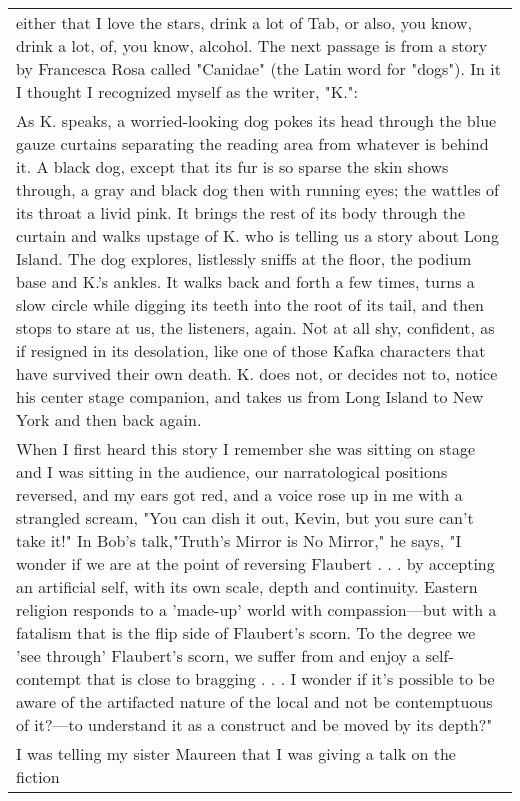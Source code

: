 \begin{longtable}[]{@{}l@{}}
\begin{minipage}[t]{0.97\columnwidth}
either that I love the stars, drink a lot of Tab, or also, you know,
drink a lot, of, you know, alcohol. The next passage is from a story by
Francesca Rosa called "Canidae" (the Latin word for "dogs"). In it I
thought I recognized myself as the writer, "K.":\strut
\end{minipage}\tabularnewline
\begin{minipage}[t]{0.97\columnwidth}\raggedright
As K. speaks, a worried-looking dog pokes its head through the blue
gauze curtains separating the reading area from whatever is behind it. A
black dog, except that its fur is so sparse the skin shows through, a
gray and black dog then with running eyes; the wattles of its throat a
livid pink. It brings the rest of its body through the curtain and walks
upstage of K. who is telling us a story about Long Island. The dog
explores, listlessly sniffs at the floor, the podium base and K.'s
ankles. It walks back and forth a few times, turns a slow circle while
digging its teeth into the root of its tail, and then stops to stare at
us, the listeners, again. Not at all shy, confident, as if resigned in
its desolation, like one of those Kafka characters that have survived
their own death. K. does not, or decides not to, notice his center stage
companion, and takes us from Long Island to New York and then back
again.\strut
\end{minipage}\tabularnewline
\begin{minipage}[t]{0.97\columnwidth}\raggedright
When I first heard this story I remember she was sitting on stage and I
was sitting in the audience, our narratological positions reversed, and
my ears got red, and a voice rose up in me with a strangled scream, "You
can dish it out, Kevin, but you sure can't take it!" In Bob's
talk,"Truth's Mirror is No Mirror," he says, "I wonder if we are at the
point of reversing Flaubert . . . by accepting an artificial self, with
its own scale, depth and continuity. Eastern religion responds to a
'made-up' world with compassion---but with a fatalism that is the flip
side of Flaubert's scorn. To the degree we 'see through' Flaubert's
scorn, we suffer from and enjoy a self-contempt that is close to
bragging . . . I wonder if it's possible to be aware of the artifacted
nature of the local and not be contemptuous of it?---to understand it as
a construct and be moved by its depth?"\strut
\end{minipage}\tabularnewline
\begin{minipage}[t]{0.97\columnwidth}\raggedright
I was telling my sister Maureen that I was giving a talk on the fiction

\end{minipage}
\end{longtable}
